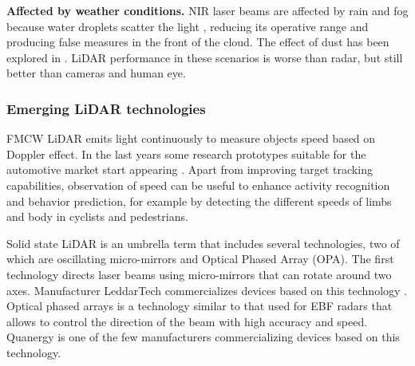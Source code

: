 \documentclass[journal]{IEEEtran}
\begin{document}
\textbf{Affected by weather conditions.} NIR laser
beams are affected by rain and fog because water droplets scatter the light 
\cite{Wang2008}, reducing its operative range and producing false measures 
in the front of the cloud. The effect of dust has been
explored in \cite{Phillips2017}. LiDAR performance in these scenarios is 
worse than radar, but still better than cameras and human eye.

\subsubsection{Emerging LiDAR technologies}
\label{sec:03-lidar-emerging}


FMCW LiDAR \cite{Nordin2004} emits light continuously to measure objects speed
based on Doppler effect. In the last years some research prototypes suitable for
the automotive market start appearing \cite{Poulton2016}.
Apart from improving target tracking capabilities, observation of speed can
be useful to enhance activity recognition and behavior prediction, for example 
by detecting the different speeds of limbs and body in cyclists and pedestrians.


Solid state LiDAR is an umbrella term that includes several technologies, two 
of which are oscillating micro-mirrors and Optical Phased Array (OPA).
The first technology directs laser beams using micro-mirrors that can 
rotate around two axes. Manufacturer LeddarTech commercializes devices
based on this technology \cite{LeddarTech2016}.
Optical phased arrays \cite{McManamon1996} is a technology similar to that used 
for EBF radars 
that allows to control the direction of the beam with high accuracy and speed.
Quanergy \cite{Eldada2017} is one of the few manufacturers commercializing
devices based on this technology.
\end{document}
